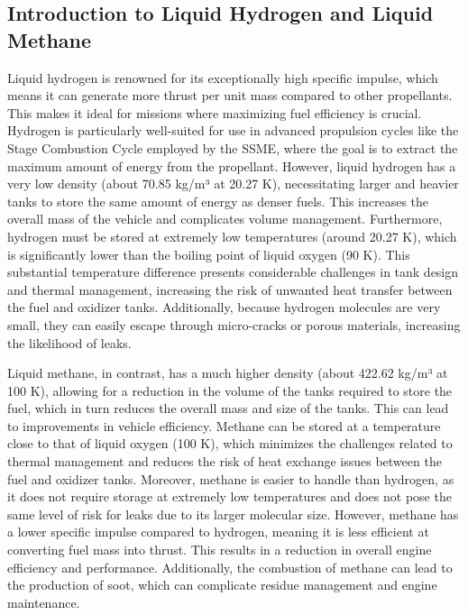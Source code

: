 \subsection{Introduction to Liquid Hydrogen and Liquid Methane}
Liquid hydrogen is renowned for its exceptionally high specific impulse, which means it can generate more thrust per unit mass compared to other propellants.
This makes it ideal for missions where maximizing fuel efficiency is crucial. 
Hydrogen is particularly well-suited for use in advanced propulsion cycles like the Stage Combustion Cycle employed by the SSME, where the goal is to extract the maximum amount of energy from the propellant.
However, liquid hydrogen has a very low density (about 70.85 kg/m³ at 20.27 K), necessitating larger and heavier tanks to store the same amount of energy as denser fuels.
This increases the overall mass of the vehicle and complicates volume management.
Furthermore, hydrogen must be stored at extremely low temperatures (around 20.27 K), which is significantly lower than the boiling point of liquid oxygen (90 K).
This substantial temperature difference presents considerable challenges in tank design and thermal management, increasing the risk of unwanted heat transfer between the fuel and oxidizer tanks.
Additionally, because hydrogen molecules are very small, they can easily escape through micro-cracks or porous materials, increasing the likelihood of leaks.

Liquid methane, in contrast, has a much higher density (about 422.62 kg/m³ at 100 K), allowing for a reduction in the volume of the tanks required to store the fuel, which in turn reduces the overall mass and size of the tanks.
This can lead to improvements in vehicle efficiency.
Methane can be stored at a temperature close to that of liquid oxygen (100 K), which minimizes the challenges related to thermal management and reduces the risk of heat exchange issues between the fuel and oxidizer tanks.
Moreover, methane is easier to handle than hydrogen, as it does not require storage at extremely low temperatures and does not pose the same level of risk for leaks due to its larger molecular size.
However, methane has a lower specific impulse compared to hydrogen, meaning it is less efficient at converting fuel mass into thrust.
This results in a reduction in overall engine efficiency and performance. Additionally, the combustion of methane can lead to the production of soot, which can complicate residue management and engine maintenance.

